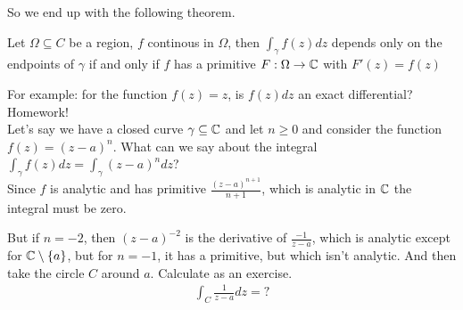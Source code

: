 So we end up with the following theorem.
\begin{theorem}[]
	Let $\Omega \subseteq C$ be a region, $f$ continous in $\Omega$, then $\int_{\gamma} f(z) dz$ depends only on the endpoints of $\gamma$ if and only if $f$ has a primitive $F: \Omega \to \mathbb{C}$ with $F'(z) = f(z)$
\end{theorem}

For example: for the function $f(z) = z$, is $f(z) dz$ an exact differential?  Homework!\\

Let's say we have a closed curve $\gamma \subseteq \mathbb{C}$ and let $n \geq 0$ and consider the function $f(z) = (z-a)^n$. What can we say about the integral $\int_{\gamma}f(z) dz = \int_{\gamma}(z-a)^n dz$?\\

Since $f$ is analytic and has primitive $\frac{(z-a)^{n+1}}{n+1}$, which is analytic in $\mathbb{C}$ the integral must be zero.

But if $n = -2$, then $(z-a)^{-2}$ is the derivative of $\frac{-1}{z-a}$, which is analytic except for $\mathbb{C} \setminus \{a\}$, but for $n = -1$, it has a primitive, but which isn't analytic. And then take the circle $C$ around $a$. Calculate as an exercise.
\begin{align*}
	\int_C \frac{1}{z-a} dz = ?
\end{align*}

